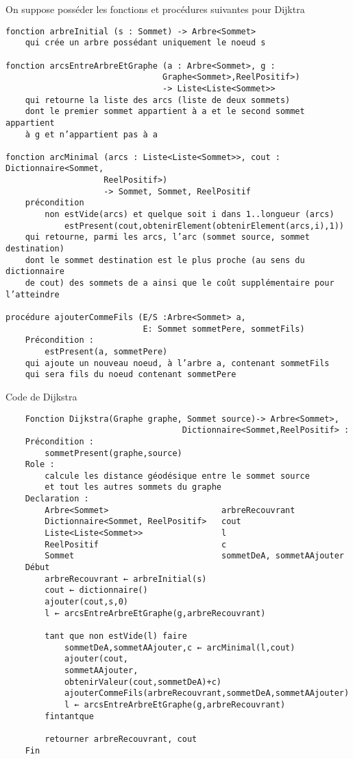 On suppose posséder les fonctions et procédures suivantes pour Dijktra
\begin{verbatim}
fonction arbreInitial (s : Sommet) -> Arbre<Sommet>
    qui crée un arbre possédant uniquement le noeud s

fonction arcsEntreArbreEtGraphe (a : Arbre<Sommet>, g :
                                Graphe<Sommet>,ReelPositif>)
                                -> Liste<Liste<Sommet>>
    qui retourne la liste des arcs (liste de deux sommets)
    dont le premier sommet appartient à a et le second sommet appartient 
    à g et n’appartient pas à a

fonction arcMinimal (arcs : Liste<Liste<Sommet>>, cout : Dictionnaire<Sommet,
                    ReelPositif>)
                    -> Sommet, Sommet, ReelPositif
    précondition
        non estVide(arcs) et quelque soit i dans 1..longueur (arcs)
            estPresent(cout,obtenirElement(obtenirElement(arcs,i),1))
    qui retourne, parmi les arcs, l’arc (sommet source, sommet destination)
    dont le sommet destination est le plus proche (au sens du dictionnaire 
    de cout) des sommets de a ainsi que le coût supplémentaire pour l’atteindre

procédure ajouterCommeFils (E/S :Arbre<Sommet> a,
                            E: Sommet sommetPere, sommetFils) 
    Précondition :
        estPresent(a, sommetPere)
    qui ajoute un nouveau noeud, à l’arbre a, contenant sommetFils 
    qui sera fils du noeud contenant sommetPere
\end{verbatim}
Code de Dijkstra
\begin{verbatim}
    Fonction Dijkstra(Graphe graphe, Sommet source)-> Arbre<Sommet>, 
                                    Dictionnaire<Sommet,ReelPositif> :
    Précondition :
        sommetPresent(graphe,source)
    Role :
        calcule les distance géodésique entre le sommet source 
        et tout les autres sommets du graphe
    Declaration :
        Arbre<Sommet>                       arbreRecouvrant
        Dictionnaire<Sommet, ReelPositif>   cout
        Liste<Liste<Sommet>>                l
        ReelPositif                         c
        Sommet                              sommetDeA, sommetAAjouter
    Début
        arbreRecouvrant ← arbreInitial(s)
        cout ← dictionnaire()
        ajouter(cout,s,0)
        l ← arcsEntreArbreEtGraphe(g,arbreRecouvrant)
       
        tant que non estVide(l) faire
            sommetDeA,sommetAAjouter,c ← arcMinimal(l,cout)
            ajouter(cout,
            sommetAAjouter,
            obtenirValeur(cout,sommetDeA)+c)
            ajouterCommeFils(arbreRecouvrant,sommetDeA,sommetAAjouter)
            l ← arcsEntreArbreEtGraphe(g,arbreRecouvrant)
        fintantque
       
        retourner arbreRecouvrant, cout
    Fin

\end{verbatim}
